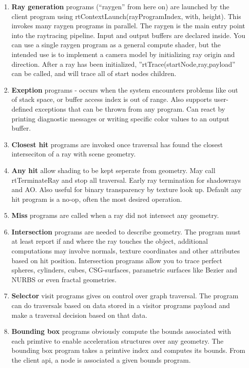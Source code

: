 \begin{enumerate}
	\item {\textbf{Ray generation} programs (``raygen'' from here on) are launched by the client program using rtContextLaunch(rayProgramIndex, with, height). This invokes many raygen programs in parallel. The raygen is the main entry point into the raytracing pipeline. Input and output buffers are declared inside. You can use a single raygen program as a general compute shader, but the intended use is to implement a camera model by initializing ray origin and direction. After a ray has been initialized, ''rtTrace(startNode,ray,payload'' can be called, and will trace all of start nodes children. }

	\item{\textbf{Exeption} programs - occurs when the system encounters problems like out of stack space, or buffer access index is out of range. Also supports user-defined exceptions that can be 	thrown from any program. Can react by printing diagnostic messages or writing specific color values to an output buffer.}

	\item{\textbf{Closest hit} programs are invoked once traversal has found the closest interseciton of a ray with scene geometry.}

	\item{\textbf{Any hit}
								allow shading to be kept seperate from geometry.
								May call rtTerminateRay and stop all traversal. Early ray termination for shadowrays and AO.
								Also useful for binary transparency by texture look up.
								Default any hit program is a no-op, often the most desired operation.}

	\item{\textbf{Miss}
								programs are called when a ray did not intersect any geometry.}

	\item {\textbf{Intersection}
                programs are needed to describe geometry. The program must at least report if and where the ray touches the object, 
                additional computations may involve normals, texture coordinates and other attributes based on hit position.
								Intersection programs allow you to trace perfect spheres, cylinders, cubes, CSG-surfaces, parametric surfaces like
								Bezier and NURBS or even fractal geometries. }
	
	\item{\textbf{Selector}
								visit programs gives on control over graph traversal.
								The program can do traversals based on data stored in a visitor programs payload and make a traversal decision based 	on that data.}

 \item{\textbf{Bounding box}
 							 programs obviously compute the bounds associated with each primtive to enable acceleration structures over any geometry.
 							 The bounding box program takes a primtive index and computes its bounds. From the client api, a node is associated a given bounds program. }
 				
\end{enumerate}

